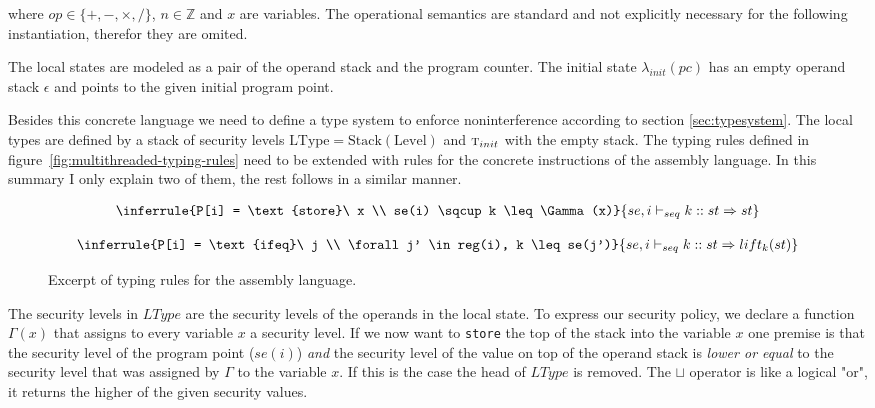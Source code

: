 \documentclass[a4paper,10pt]{llncs}
\begin{document}
where $op \in \{+,-,\times,/\}$, $n \in \mathbb{Z}$ and $x$ are variables. The
operational semantics are standard and not explicitly necessary for the following
instantiation, therefor they are omited.

The local states are modeled as a pair of the operand stack and the program counter. The
initial state $\lambda_{init}(pc)$ has an empty operand stack $\epsilon$ and points to
the given initial program point.

Besides this concrete language we need to define a type system to enforce noninterference
according to section \ref{sec:typesystem}. The local types are defined by a stack of security levels
$\text{LType} = \text{Stack}(\text{Level})$ and $\textsc{t}_{init}$ with the empty stack. The typing rules defined in
figure~\ref{fig:multithreaded-typing-rules} need to be extended with rules for the concrete instructions
of the assembly language. In this summary I only explain two of them, the rest follows
in a similar manner.

\begin{figure}
\begin{minipage}{.5\textwidth}
\begin{align*}
\inferrule{P[i] = \text{store}\ x \\ se(i) \sqcup k \leq \Gamma(x)}
{se, i \vdash_{seq} k :: st \Rightarrow st}
\end{align*}
\end{minipage}
\begin{minipage}{.5\textwidth}
\begin{align*}
\inferrule{P[i] = \text{ifeq}\ j \\ \forall j' \in reg(i), k \leq se(j')}
{se, i \vdash_{seq} k :: st \Rightarrow lift_k(st)}
\end{align*}
\end{minipage}
\caption{Excerpt of typing rules for the assembly language.}
\label{fig:transfer-rules}
\end{figure}

The security levels in $LType$ are the security levels of the operands in the local state. To
express our security policy, we declare a function $\Gamma(x)$ that assigns to every variable
$x$ a security level. If we now want to \texttt{store} the top of the stack into the variable
$x$ one premise is that the security level of the program point ($se(i)$) \textit{and} the
security level of the value on top of the operand stack is \textit{lower or equal} to the
security level that was assigned by $\Gamma$ to the variable $x$. If this is the case the head
of $LType$ is removed. The $\sqcup$ operator is like a logical "or", it returns the higher of
the given security values.
\end{document}
